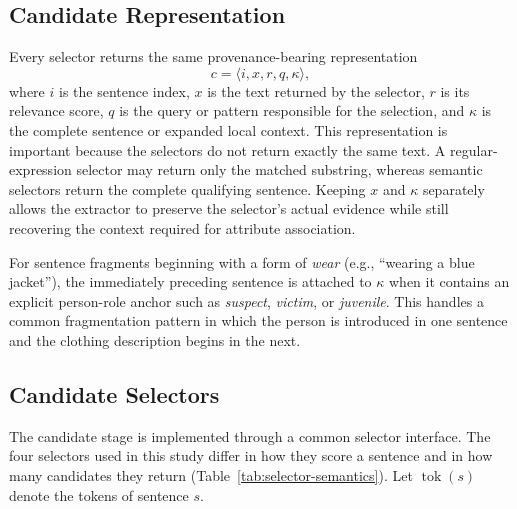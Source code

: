 \documentclass[sigconf,nonacm]{acmart}
\begin{document}
\subsection{Candidate Representation}
\label{subsec:candidate-representation}

Every selector returns the same provenance-bearing representation
\[
c=\langle i, x, r, q, \kappa\rangle,
\]
where $i$ is the sentence index, $x$ is the text returned by the selector,
$r$ is its relevance score, $q$ is the query or pattern responsible for the
selection, and $\kappa$ is the complete sentence or expanded local context.
This representation is important because the selectors do not return exactly
the same text.  A regular-expression selector may return only the matched
substring, whereas semantic selectors return the complete qualifying sentence.
Keeping $x$ and $\kappa$ separately allows the extractor to preserve the
selector's actual evidence while still recovering the context required for
attribute association.

For sentence fragments beginning with a form of \emph{wear} (e.g.,
``wearing a blue jacket''), the immediately preceding sentence is attached to
$\kappa$ when it contains an explicit person-role anchor such as
\emph{suspect}, \emph{victim}, or \emph{juvenile}.  This handles a common
fragmentation pattern in which the person is introduced in one sentence and
the clothing description begins in the next.

\subsection{Candidate Selectors}
\label{subsec:candidate-selectors}

The candidate stage is implemented through a common selector interface.  The
four selectors used in this study differ in how they score a sentence and in
how many candidates they return (Table~\ref{tab:selector-semantics}).  Let
$\operatorname{tok}(s)$ denote the tokens of sentence $s$.
\end{document}
